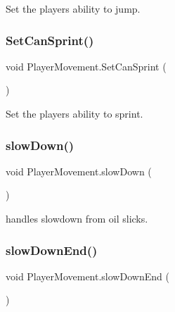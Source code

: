 Set the player\textquotesingle{}s ability to jump. 

\mbox{\label{class_player_movement_a6eca87a71348040e0eedb138eb1c3a0c}} 
\subsubsection{\texorpdfstring{Set\+Can\+Sprint()}{SetCanSprint()}}
{\footnotesize\ttfamily void Player\+Movement.\+Set\+Can\+Sprint (\begin{DoxyParamCaption}{ }\end{DoxyParamCaption})}



Set the player\textquotesingle{}s ability to sprint. 

\mbox{\label{class_player_movement_a688ef83dd4792fdb5bcf76195b7f2fae}} 
\subsubsection{\texorpdfstring{slow\+Down()}{slowDown()}}
{\footnotesize\ttfamily void Player\+Movement.\+slow\+Down (\begin{DoxyParamCaption}{ }\end{DoxyParamCaption})}



handles slowdown from oil slicks. 

\mbox{\label{class_player_movement_a323e163d04bd2b048ca8d17510cfe299}} 
\subsubsection{\texorpdfstring{slow\+Down\+End()}{slowDownEnd()}}
{\footnotesize\ttfamily void Player\+Movement.\+slow\+Down\+End (\begin{DoxyParamCaption}{ }\end{DoxyParamCaption})}



